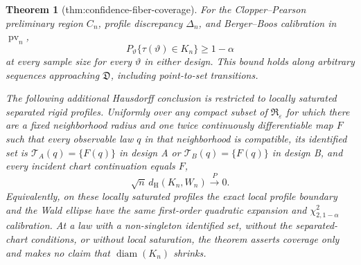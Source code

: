 \documentclass{article}
\newtheorem{theorem}{Theorem}
\begin{document}
\begin{theorem}[thm:confidence-fiber-coverage]\label{thm:confidence-fiber-coverage}
For the Clopper--Pearson preliminary region \(C_n\), profile discrepancy \(\Delta_n\), and Berger--Boos calibration in \(\operatorname{pv}_n\),
\[
P_{\vartheta}\{\tau(\vartheta)\in K_n\}\ge1-\alpha
\]
at every sample size for every \(\vartheta\) in either design.  This bound holds along arbitrary sequences approaching \(\mathfrak D\), including point-to-set transitions.

The following additional Hausdorff conclusion is restricted to locally saturated separated rigid profiles.  Uniformly over any compact subset of \(\mathfrak R_{\varepsilon}\) for which there are a fixed neighborhood radius and one twice continuously differentiable map \(F\) such that every observable law \(q\) in that neighborhood is compatible, its identified set is \(\mathcal T_A(q)=\{F(q)\}\) in design A or \(\mathcal T_B(q)=\{F(q)\}\) in design B, and every incident chart continuation equals \(F\),
\[
\sqrt n\,d_{\mathrm H}(K_n,W_n)\xrightarrow{P}0.
\]
Equivalently, on these locally saturated profiles the exact local profile boundary and the Wald ellipse have the same first-order quadratic expansion and \(\chi^2_{2,1-\alpha}\) calibration.  At a law with a non-singleton identified set, without the separated-chart conditions, or without local saturation, the theorem asserts coverage only and makes no claim that \(\operatorname{diam}(K_n)\) shrinks.
\end{theorem}
\end{document}
